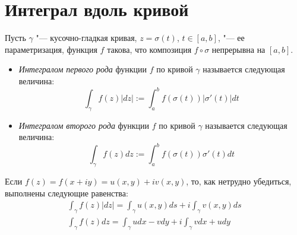 \section{Интеграл вдоль кривой}

\begin{definition}
	Пусть $\gamma$ "--- кусочно-гладкая кривая, $z = \sigma(t)$, $t \in [a, b]$, "--- ее параметризация, функция $f$ такова, что композиция $f\circ\sigma$ непрерывна на $[a, b]$.
	\begin{itemize}
		\item \textit{Интегралом первого рода} функции $f$ по кривой $\gamma$ называется следующая величина:
		\[\int_{\gamma}f(z)|dz| := \int_a^bf(\sigma(t))|\sigma'(t)|dt\]
		\item \textit{Интегралом второго рода} функции $f$ по кривой $\gamma$ называется следующая величина:
		\[\int_{\gamma}f(z)dz := \int_a^bf(\sigma(t))\sigma'(t)dt\]
	\end{itemize}
\end{definition}

\begin{note}
	Если $f(z) = f(x + iy) = u(x, y) + iv(x, y)$, то, как нетрудно убедиться, выполнены следующие равенства:
	\begin{gather*}
		\int_{\gamma}f(z)|dz| = \int_\gamma u(x, y)ds + i\int_\gamma v(x, y)ds
		\\
		\int_{\gamma}f(z)dz = \int_\gamma udx - vdy + i\int_\gamma vdx + udy
	\end{gather*}
\end{note}

